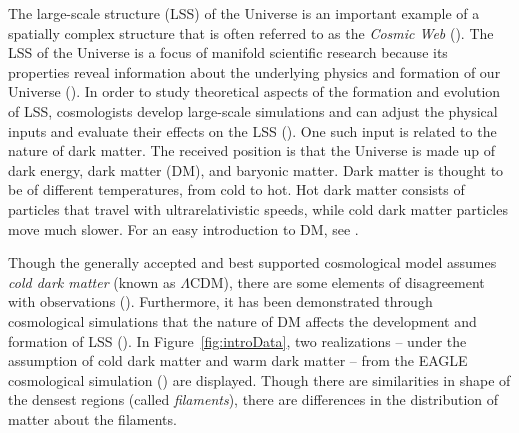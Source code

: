 \documentclass[12pt]{article}
\newcommand{\figref}[1]{Figure~\ref{#1}}
\begin{document}
The large-scale structure (LSS) of the Universe is an important example of a spatially complex structure that is often referred to as the \emph{Cosmic Web} (\cite{bond1996filaments,springel2006large}). The LSS of the Universe is a focus of manifold scientific research because its properties reveal information about the underlying physics and formation of our Universe (\cite{davis1985evolution}). In order to study theoretical aspects of the formation and evolution of LSS, cosmologists develop large-scale simulations and can adjust the physical inputs and evaluate their effects on the LSS (\cite{cooray2002halo,centrella1983three,doroshkevich1980two,schaye2015eagle}). One such input is related to the nature of dark matter. The received position is that the Universe is made up of dark energy, dark matter (DM), and baryonic matter. Dark matter is thought to be of different temperatures, from cold to hot. Hot dark matter consists of particles that travel with ultrarelativistic speeds, while cold dark matter particles move much slower. For an easy introduction to DM, see \cite[p. 61-63]{HilbeEtAl2014}.  

Though the generally accepted and best supported cosmological model assumes \emph{cold dark matter} (known as $\Lambda$CDM), there are some elements of disagreement with observations (\cite{SchneiderEtAl2012}). Furthermore, it has been demonstrated through cosmological simulations that the nature of DM affects the development and formation of LSS (\cite{SchneiderEtAl2012}).  In \figref{fig:introData}, two realizations -- under the assumption of cold dark matter and warm dark matter -- from the EAGLE cosmological simulation (\cite{schaye2015eagle}) are displayed. Though there are similarities in shape of the densest regions (called \emph{filaments}), there are differences in the distribution of matter about the filaments.  
\end{document}
